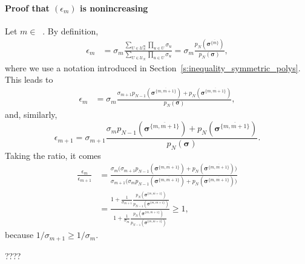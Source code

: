 \documentclass[twoside,11pt]{book}
\DeclareMathOperator{\Ns}{\mathbb{N}^{*}}
\begin{document}
\paragraph{Proof that $(\epsilon_{m})$ is nonincreasing}
\label{s:epsilon_non_increasing}
Let $m \in \Ns$. By definition,
\begin{align}
\epsilon_{m} & = \sigma_{m} \frac{\sum_{U \in \mathcal{U}_{N}^{m}} \prod_{u \in U} \sigma_{u}}{\sum_{U \in \mathcal{U}_{N}} \prod_{u \in U} \sigma_{u}} = \sigma_{m} \frac{p_{N}(\bm{\sigma}^{\overline{\{m\}}})}{p_{N}(\bm{\sigma})},
\end{align}
where we use a notation introduced in Section~\ref{s:inequality_symmetric_polys}. This leads to
\begin{align}
  \epsilon_m & = \sigma_{m} \frac{ \sigma_{m+1}p_{N-1}(\bm{\sigma}^{\overline{\{m,m+1 \}}}) + p_{N}(\bm{\sigma}^{\overline{\{m,m+1 \}}})}{p_{N}(\bm{\sigma})},
\end{align}
and, similarly,
\begin{equation}
\epsilon_{m+1} = \sigma_{m+1} \frac{ \sigma_{m}p_{N-1}(\bm{\sigma}^{\overline{\{m,m+1 \}}}) + p_{N}(\bm{\sigma}^{\overline{\{m,m+1 \}}})}{p_{N}(\bm{\sigma})}.
\end{equation}
Taking the ratio, it comes
\begin{align}
\frac{\epsilon_{m}}{\epsilon_{m+1}} & = \frac{\sigma_{m} \bigg( \sigma_{m+1}p_{N-1}\left(\bm{\sigma}^{\overline{\{m,m+1 \}}} \right) + p_{N} \left(\bm{\sigma}^{\overline{\{m,m+1 \}}} \right)\bigg)}{\sigma_{m+1} \bigg( \sigma_{m}p_{N-1}\left(\bm{\sigma}^{\overline{\{m,m+1 \}}} \right) + p_{N} \left(\bm{\sigma}^{\overline{\{m,m+1 \}}}\right)\bigg)}\\
& = \frac{1  + \frac{1}{\sigma_{m+1}}\frac{p_{N} \left(\bm{\sigma}^{\overline{\{m,m+1 \}}} \right) }{ p_{N-1} \left(\bm{\sigma}^{\overline{\{m,m+1 \}}} \right)} }{1  + \frac{1}{\sigma_{m} }\frac{p_{N} \left(\bm{\sigma}^{\overline{\{m,m+1 \}}} \right) }{p_{N-1} \left(\bm{\sigma}^{\overline{\{m,m+1 \}}}\right)}} \geq 1,
\end{align}
because $1/\sigma_{m+1} \geq 1/\sigma_{m}$.

????
\end{document}

